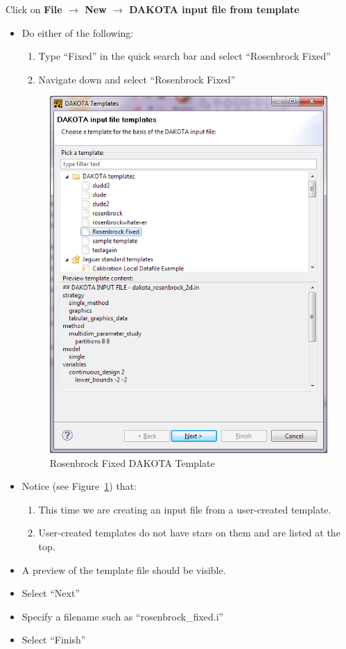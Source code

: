 Click on {\bf File $\rightarrow$ New $\rightarrow$ DAKOTA input file from template} 
\begin{itemize}
\item Do either of the following:
\begin{enumerate}
\item Type ``Fixed'' in the quick search bar and select ``Rosenbrock Fixed''
\item Navigate down and select ``Rosenbrock Fixed''
\end{enumerate}
\begin{figure}[htbp]
  \centering
  \includegraphics[scale=0.6]{images/10Template_Rosenbrock}
  \caption{Rosenbrock Fixed DAKOTA Template}
  \label{fig:input:10Template_Rosenbrock}
\end{figure}

\item Notice (see Figure~\ref{fig:input:10Template_Rosenbrock}) that:
\begin{enumerate}
\item This time we are creating an input file from a user-created template.
\item User-created templates do not have stars on them and are listed at the top.
\end{enumerate} 
\item A preview of the template file should be visible.
\item Select ``Next''
\item Specify a filename such as ``rosenbrock\_fixed.i'' 
\item Select ``Finish''
\end{itemize}


